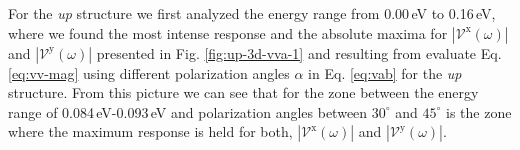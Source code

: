 \documentclass[prb,11pt,tightenlines,twocolumn,aps]{revtex4-1}
\begin{document}
For the \emph{up} structure we first analyzed the energy range from 0.00\,eV to
0.16\,eV, where we found the most intense response and the absolute maxima for
$|\mathcal{V}^{\mathrm{x}}(\omega)|$ and $|\mathcal{V}^{\mathrm{y}}(\omega)|$
presented in Fig. \ref{fig:up-3d-vva-1} and resulting from evaluate Eq.
\eqref{eq:vv-mag} using different polarization angles $\alpha$ in Eq.
\eqref{eq:vab} for the \emph{up} structure.
%
From this picture we can see that for the zone between the energy range of
0.084\,eV-0.093\,eV and polarization angles between $30^{\circ}$ and
$45^{\circ}$ is the zone where the maximum response is held for both,
$|\mathcal{V}^{\mathrm{x}}(\omega)|$ and $|\mathcal{V}^{\mathrm{y}}(\omega)|$.
\end{document}
